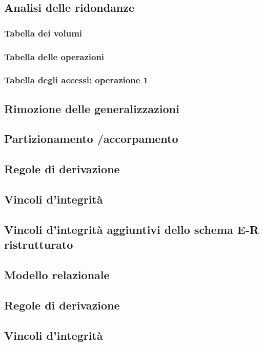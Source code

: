 \documentclass[a4paper]{article}
\begin{document}
\subsection{Analisi delle ridondanze}
\subsubsection{Tabella dei volumi}
\subsubsection{Tabella delle operazioni}
\subsubsection{Tabella degli accessi: operazione 1}

\subsection{Rimozione delle generalizzazioni}

\subsection{Partizionamento /accorpamento}

\subsection{Regole di derivazione}

\subsection{Vincoli d'integrità}

\subsection{Vincoli d'integrità aggiuntivi dello schema E-R ristrutturato}

\subsection{Modello relazionale}


\subsection{Regole di derivazione}

\subsection{Vincoli d'integrità}
\end{document}
